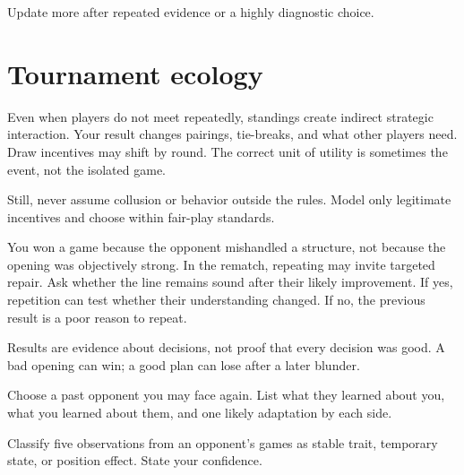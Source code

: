 Update more after repeated evidence or a highly diagnostic choice.

\section{Tournament ecology}
Even when players do not meet repeatedly, standings create indirect strategic interaction. Your result changes pairings, tie-breaks, and what other players need. Draw incentives may shift by round. The correct unit of utility is sometimes the event, not the isolated game.

Still, never assume collusion or behavior outside the rules. Model only legitimate incentives and choose within fair-play standards.

\begin{workedbox}[title={Worked example: repeat the opening?}]
You won a game because the opponent mishandled a structure, not because the opening was objectively strong. In the rematch, repeating may invite targeted repair. Ask whether the line remains sound after their likely improvement. If yes, repetition can test whether their understanding changed. If no, the previous result is a poor reason to repeat.
\end{workedbox}

\begin{warningbox}
Results are evidence about decisions, not proof that every decision was good. A bad opening can win; a good plan can lose after a later blunder.
\end{warningbox}

\begin{exercise}
Choose a past opponent you may face again. List what they learned about you, what you learned about them, and one likely adaptation by each side.
\end{exercise}

\begin{exercise}
Classify five observations from an opponent's games as stable trait, temporary state, or position effect. State your confidence.
\end{exercise}

